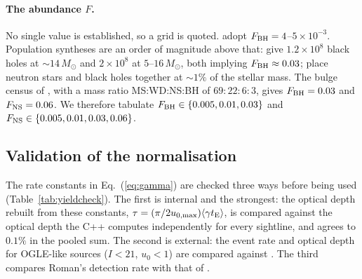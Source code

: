 \documentclass[english,10pt,a4paper]{article}
\newcommand{\tE}{t_{\rm E}}
\newcommand{\Msun}{M_\odot}
\begin{document}
\paragraph{The abundance $F$.} No single value is established, so a grid is quoted. \citet{SajadianMakler2026}
adopt $F_{\rm BH} = 4$--$5\times10^{-3}$. Population syntheses are an order of magnitude
above that: \citet{Olejak2020} give $1.2\times10^{8}$ black holes at $\sim\!14\,\Msun$ and
\citet{Lam2020} $2\times10^{8}$ at $5$--$16\,\Msun$, both implying $F_{\rm BH}\approx0.03$;
\citet{Sweeney2022} place neutron stars and black holes together at $\sim\!1\%$ of the stellar
mass. The bulge census of \citet{Gould2000}, with a mass ratio MS:WD:NS:BH of $69\!:\!22\!:\!6\!:\!3$,
gives $F_{\rm BH}=0.03$ and $F_{\rm NS}=0.06$. We therefore tabulate
$F_{\rm BH}\in\{0.005,0.01,0.03\}$ and $F_{\rm NS}\in\{0.005,0.01,0.03,0.06\}$.

\subsection{Validation of the normalisation}

The rate constants in Eq.~(\ref{eq:gamma}) are checked three ways before being used
(Table~\ref{tab:yieldcheck}). The first is internal and the strongest: the optical depth rebuilt
from these constants, $\tau = (\pi/2u_{0,\max})\langle\gamma \tE\rangle$, is compared against the
optical depth the C++ computes independently for every sightline, and agrees to $0.1\%$ in the
pooled sum. The second is external: the event rate and optical depth for OGLE-like sources
($I<21$, $u_0<1$) are compared against \citet{Mroz2019}. The third compares Roman's detection
rate with that of \citet{Penny2019}.
\end{document}
